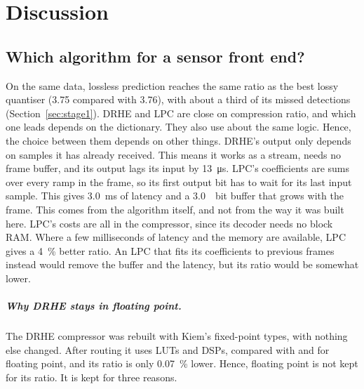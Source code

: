 \chapter{Discussion}
\label{ch:discussion}

\section{Which algorithm for a sensor front end?}
\label{sec:choice}

On the same data, lossless prediction reaches the same ratio as the best lossy
quantiser (\num{3.75} compared with \num{3.76}), with about a third of its
missed detections (Section~\ref{sec:stage1}). DRHE and LPC are close on
compression ratio, and which one leads depends on the dictionary. They also use
about the same logic. Hence, the choice between them depends on other things.
DRHE's output only depends on samples it has already received. This means it
works as a stream, needs no frame buffer, and its output lags its input by
\SI{13}{\micro\second}. LPC's coefficients are sums over every ramp in the
frame, so its first output bit has to wait for its last input sample. This
gives \SI{3.0}{\milli\second} of latency and a \SI{3.0}{\mebi bit} buffer
that grows with the frame. This comes from the algorithm itself, and not from
the way it was built here. LPC's costs are all in the compressor, since its
decoder needs no block RAM. Where a few milliseconds of latency and the memory
are available, LPC gives a \SI{4}{\percent} better ratio. An LPC that fits its
coefficients to previous frames instead would remove the buffer and the
latency, but its ratio would be somewhat lower.

\paragraph{Why DRHE stays in floating point.} The DRHE compressor was rebuilt
with Kiem's fixed-point types, with nothing else changed. After routing it uses
 LUTs and  DSPs, compared with 
and  for floating point, and its ratio is only
\SI{0.07}{\percent} lower. Hence, floating point is not kept for its ratio. It
is kept for three reasons.

